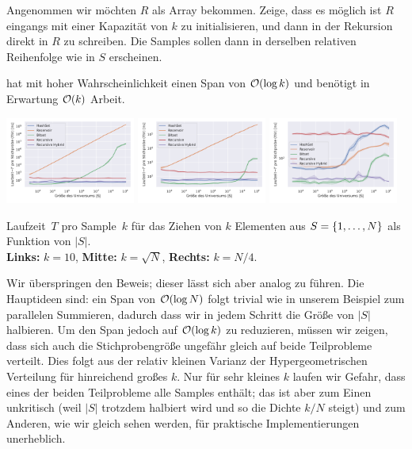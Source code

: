 \begin{exercise}
    Angenommen wir möchten $R$ als Array bekommen.
    Zeige, dass es möglich ist $R$ eingangs mit einer Kapazität von $k$ zu initialisieren, und dann in der Rekursion direkt in $R$ zu schreiben.
    Die Samples sollen dann in derselben relativen Reihenfolge wie in $S$ erscheinen.
\end{exercise}

\begin{lemma}
     hat mit hoher Wahrscheinlichkeit einen Span von $\mathcal{O}\!\left(\log k\right)$ und benötigt in Erwartung $\mathcal{O}\!\left(k\right)$ Arbeit.
\end{lemma}

\begin{widefigure}
    \includegraphics[width=0.32\textwidth]{data/gnm_recursive_scale0.pdf}\hfill
    \includegraphics[width=0.32\textwidth]{data/gnm_recursive_scale1.pdf}\hfill
    \includegraphics[width=0.32\textwidth]{data/gnm_recursive_scale2.pdf}

    \caption{
        Laufzeit~$T$ pro Sample~$k$ für das Ziehen von $k$ Elementen aus $S = \left\{1, \ldots, N\right\}$ als Funktion von $|S|$.\\
        \textbf{Links:} $k=10$, \textbf{Mitte: } $k = \sqrt{N}$, \textbf{Rechts: } $k = N / 4$.
    }
    \label{fig:benchmark_gnm_recursive_scale}
\end{widefigure}

Wir überspringen den Beweis; dieser lässt sich aber analog zu \cite{DBLP:journals/toms/Hubschle-Schneider22} führen.
Die Hauptideen sind: ein Span von $\mathcal{O}\!\left(\log N\right)$ folgt trivial wie in unserem Beispiel zum parallelen Summieren, dadurch dass wir in jedem Schritt die Größe von $|S|$ halbieren.
Um den Span jedoch auf $\mathcal{O}\!\left(\log k\right)$ zu reduzieren, müssen wir zeigen, dass sich auch die Stichprobengröße ungefähr gleich auf beide Teilprobleme verteilt.
Dies folgt aus der relativ kleinen Varianz der Hypergeometrischen Verteilung für hinreichend großes $k$.
Nur für sehr kleines $k$ laufen wir Gefahr, dass eines der beiden Teilprobleme alle Samples enthält;
das ist aber zum Einen unkritisch (weil $|S|$ trotzdem halbiert wird und so die Dichte $k/N$ steigt) und zum Anderen, wie wir gleich sehen werden, für praktische Implementierungen unerheblich.

